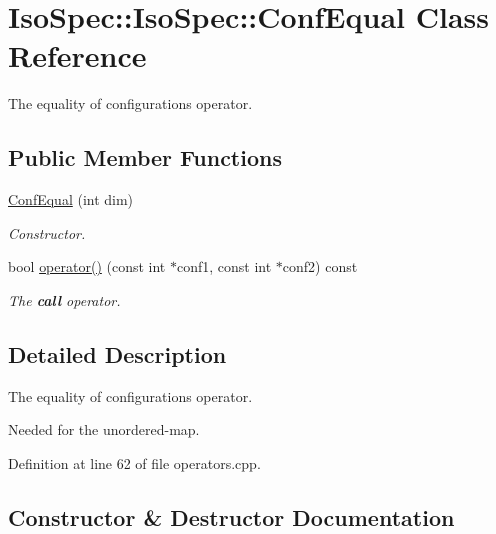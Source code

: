 \hypertarget{class_iso_spec_1_1_iso_spec_1_1_conf_equal}{}\section{Iso\+Spec\+:\+:Iso\+Spec\+:\+:Conf\+Equal Class Reference}
\label{class_iso_spec_1_1_iso_spec_1_1_conf_equal}


The equality of configurations operator.  


\subsection*{Public Member Functions}
\begin{DoxyCompactItemize}
\item 
\mbox{\hyperlink{class_iso_spec_1_1_iso_spec_1_1_conf_equal_a1e64267307db788516b6dfc98614d4a8}{Conf\+Equal}} (int dim)
\begin{DoxyCompactList}\small\item\em Constructor. \end{DoxyCompactList}\item 
bool \mbox{\hyperlink{class_iso_spec_1_1_iso_spec_1_1_conf_equal_ad9d7fb4a033b947a983b302cb3e0c735}{operator()}} (const int $\ast$conf1, const int $\ast$conf2) const
\begin{DoxyCompactList}\small\item\em The {\bfseries call} operator. \end{DoxyCompactList}\end{DoxyCompactItemize}


\subsection{Detailed Description}
The equality of configurations operator. 

Needed for the unordered-\/map. 

Definition at line 62 of file operators.\+cpp.



\subsection{Constructor \& Destructor Documentation}
\mbox{\label{class_iso_spec_1_1_iso_spec_1_1_conf_equal_a1e64267307db788516b6dfc98614d4a8}} 
